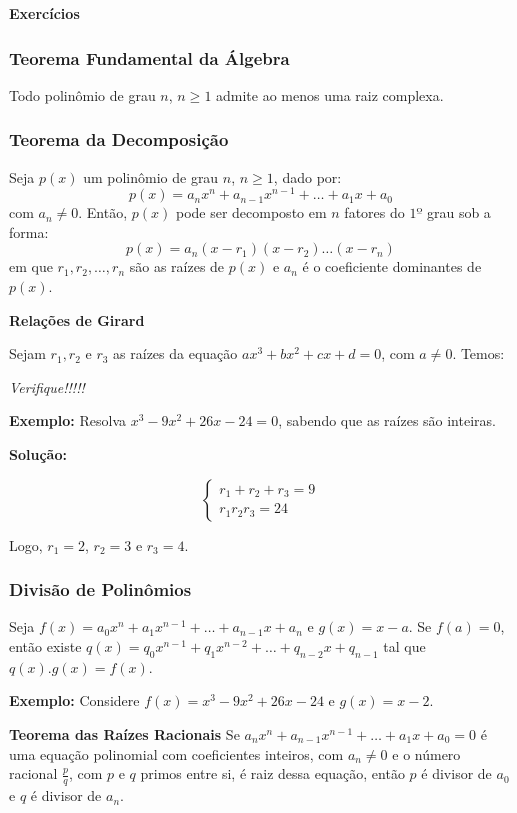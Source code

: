 \documentclass[oneside,a4paper,12pt]{article}
\begin{document}
\textbf{Exercícios}

\subsubsection{Teorema Fundamental da Álgebra}

Todo polinômio de grau $n$, $n \geq 1$ admite ao menos uma raiz complexa.

\subsubsection{Teorema da Decomposição}

Seja $p(x)$ um polinômio de grau $n$, $n \geq 1$, dado por: $$p(x) = a_nx^n+a_{n-1}x^{n-1}+\dots+a_1x+a_0$$ com $a_n \neq 0$. Então, $p(x)$ pode ser decomposto em $n$ fatores do $1º$ grau sob a forma:
$$p(x) = a_n(x-r_1)(x-r_2)\dots(x-r_n)$$
em que $r_1, r_2, \dots, r_n$ são as raízes de $p(x)$ e $a_n$ é o coeficiente dominantes de $p(x)$.

\textbf{Relações de Girard}

Sejam $r_1,r_2$ e $r_3$ as raízes da equação $ax^{3}+bx^{2}+cx+d=0$, com $a \neq 0$. Temos:

{\it Verifique!!!!!}


\textbf{Exemplo:} Resolva $x^3-9x^2+26x-24=0$, sabendo que as raízes são inteiras.

{\bf Solução:}

$$\begin{cases}
	r_1+r_2+r_3 = 9 \\
	r_1r_2r_3 = 24
\end{cases}$$

Logo, $r_1 = 2$, $r_2 = 3$ e $r_3 = 4$.

\subsubsection{Divisão de Polinômios}

Seja $f(x) = a_0x^n+a_1x^{n-1}+\dots+a_{n-1}x+a_n$ e $g(x)=x-a$. Se $f(a)=0$, então existe $q(x)=q_0x^{n-1}+q_1x^{n-2}+\dots+q_{n-2}x+q_{n-1}$ tal que $q(x).g(x)=f(x)$.

\textbf{Exemplo:} Considere $f(x)=x^3-9x^2+26x-24$ e $g(x)=x-2$.

\vspace{200pt}

\textbf{Teorema das Raízes Racionais} Se $a_nx^n+a_{n-1}x^{n-1}+\dots+a_1x+a_0 = 0$ é uma equação polinomial com coeficientes inteiros, com $a_n \neq 0$ e o número racional $\frac{p}{q}$, com $p$ e $q$ primos entre si, é raiz dessa equação, então $p$ é divisor de $a_0$ e $q$ é divisor de $a_n$.
\end{document}
